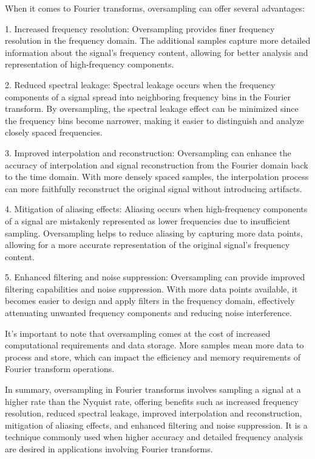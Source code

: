 When it comes to Fourier transforms, oversampling can offer several advantages:

1. Increased frequency resolution: Oversampling provides finer frequency resolution in the frequency domain. The additional samples capture more detailed information about the signal's frequency content, allowing for better analysis and representation of high-frequency components.

2. Reduced spectral leakage: Spectral leakage occurs when the frequency components of a signal spread into neighboring frequency bins in the Fourier transform. By oversampling, the spectral leakage effect can be minimized since the frequency bins become narrower, making it easier to distinguish and analyze closely spaced frequencies.

3. Improved interpolation and reconstruction: Oversampling can enhance the accuracy of interpolation and signal reconstruction from the Fourier domain back to the time domain. With more densely spaced samples, the interpolation process can more faithfully reconstruct the original signal without introducing artifacts.

4. Mitigation of aliasing effects: Aliasing occurs when high-frequency components of a signal are mistakenly represented as lower frequencies due to insufficient sampling. Oversampling helps to reduce aliasing by capturing more data points, allowing for a more accurate representation of the original signal's frequency content.

5. Enhanced filtering and noise suppression: Oversampling can provide improved filtering capabilities and noise suppression. With more data points available, it becomes easier to design and apply filters in the frequency domain, effectively attenuating unwanted frequency components and reducing noise interference.

It's important to note that oversampling comes at the cost of increased computational requirements and data storage. More samples mean more data to process and store, which can impact the efficiency and memory requirements of Fourier transform operations.

In summary, oversampling in Fourier transforms involves sampling a signal at a higher rate than the Nyquist rate, offering benefits such as increased frequency resolution, reduced spectral leakage, improved interpolation and reconstruction, mitigation of aliasing effects, and enhanced filtering and noise suppression. It is a technique commonly used when higher accuracy and detailed frequency analysis are desired in applications involving Fourier transforms.

